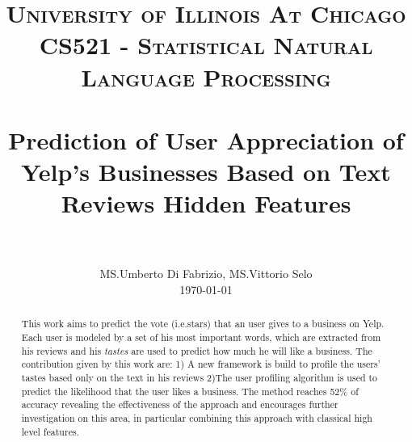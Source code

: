 \documentclass[a4paper, 10pt, conference]{ieeeconf}      %
\title{
		\usefont{OT1}{bch}{b}{n}
		\normalfont \normalsize \textsc{University of Illinois At Chicago\\CS521 - Statistical Natural Language Processing} \\ [25pt]
		\horrule{2pt} \\[0.4cm]
		\huge Prediction of User Appreciation of Yelp's Businesses Based on Text Reviews Hidden Features \\
		\horrule{2pt} \\[0.3cm]
}
\author{
		\normalfont 								\large
         MS.Umberto Di Fabrizio, MS.Vittorio Selo\\		\normalsize
        \today \\[0.5cm]
}
\date{}
\begin{document}
\maketitle
\thispagestyle{empty}
\pagestyle{empty}

\begin{abstract}
	This work aims to predict the vote (i.e.stars) that an user gives to a business on Yelp. Each user is modeled by a set of his most important words, which are extracted from his reviews and his \textit{tastes} are used to predict how much he will like a business. The contribution given by this work are: 1) A new framework is build to profile the users' tastes based only on the text in his reviews 2)The user profiling algorithm is used to predict the likelihood that the user likes a business. The method reaches 52\% of accuracy revealing the effectiveness of the approach and encourages further investigation on this area, in particular combining this approach with classical high level features.
\end{abstract}
\end{document}
